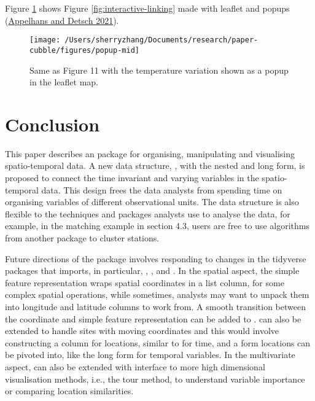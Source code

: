 \documentclass{article}
\begin{document}
Figure \ref{fig:interactive-popup} shows Figure \ref{fig:interactive-linking} made with leaflet and popups (\protect\hyperlink{ref-leafpop}{Appelhans and Detsch 2021}).

\begin{figure}

{\centering \texttt{[image: /Users/sherryzhang/Documents/research/paper-cubble/figures/popup-mid]} 

}

\caption{Same as Figure 11 with the temperature variation shown as a popup in the leaflet map.}\label{fig:interactive-popup}
\end{figure}

\hypertarget{conclude}{%
\section{Conclusion}\label{conclude}}

This paper describes an  package  for organising, manipulating and visualising spatio-temporal data. A new data structure, , with the nested and long form, is proposed to connect the time invariant and varying variables in the spatio-temporal data. This design frees the data analysts from spending time on organising variables of different observational units. The data structure is also flexible to the techniques and packages analysts use to analyse the data, for example, in the matching example in section 4.3, users are free to use algorithms from another package to cluster stations.

Future directions of the package involves responding to changes in the tidyverse packages that  imports, in particular, , , and . In the spatial aspect, the simple feature representation wraps spatial coordinates in a list column, for some complex spatial operations, while sometimes, analysts may want to unpack them into longitude and latitude columns to work from. A smooth transition between the coordinate and simple feature representation can be added to .  can also be extended to handle sites with moving coordinates and this would involve constructing a  column for locations, similar to  for time, and a form locations can be pivoted into, like the long form for temporal variables. In the multivariate aspect,  can also be extended with interface to more high dimensional visualisation methods, i.e., the tour method, to understand variable importance or comparing location similarities.
\end{document}
